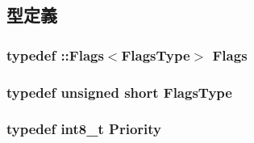 \subsection{型定義}
\hypertarget{classEventBase_ad6cda6b0b8d7ddfbf8e769082577b482}{
\subsubsection[{Flags}]{\setlength{\rightskip}{0pt plus 5cm}typedef ::{\bf Flags}$<${\bf FlagsType}$>$ {\bf Flags}}}
\label{classEventBase_ad6cda6b0b8d7ddfbf8e769082577b482}
\hypertarget{classEventBase_ad01d22e048b90a29dcd44109f5fc4c5e}{
\subsubsection[{FlagsType}]{\setlength{\rightskip}{0pt plus 5cm}typedef unsigned short {\bf FlagsType}}}
\label{classEventBase_ad01d22e048b90a29dcd44109f5fc4c5e}
\hypertarget{classEventBase_a6d92f7ee8144a5911ed46d85a89a4934}{
\subsubsection[{Priority}]{\setlength{\rightskip}{0pt plus 5cm}typedef int8\_\-t {\bf Priority}}}
\label{classEventBase_a6d92f7ee8144a5911ed46d85a89a4934}


